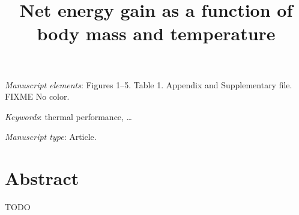 \documentclass[11pt]{article}
\begin{document}


\title{Net energy gain as a function of body mass and temperature}


\date{}

\maketitle

\bigskip

\noindent
\textit{Manuscript elements}:
Figures 1--5.
Table 1.
Appendix and Supplementary file. FIXME
No color.

\bigskip

\noindent
\textit{Keywords}:
thermal performance, \ldots

\bigskip

\noindent
\textit{Manuscript type}:
Article.

\vfill


\newpage


\linenumbers{}

\section*{Abstract}

TODO

\newpage

\end{document}
